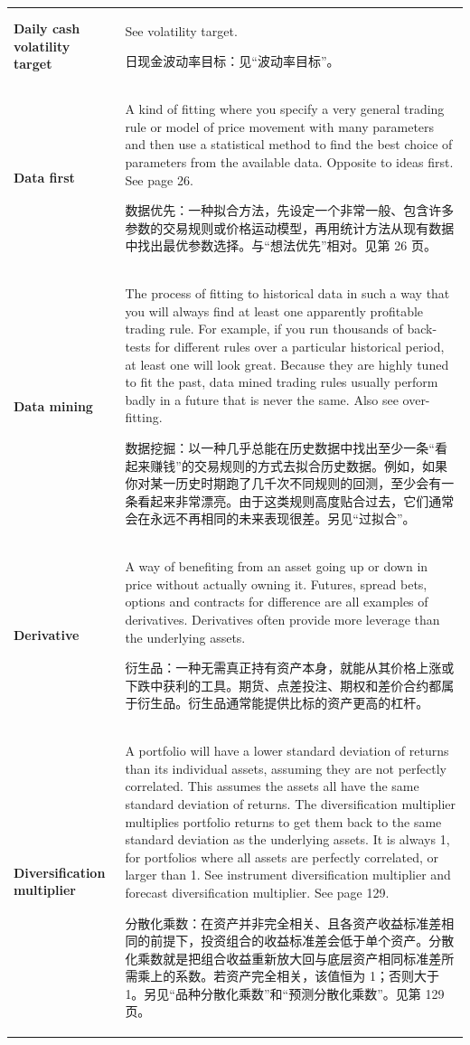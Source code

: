 \begin{chinesetableblock}
{\begin{longtable}{@{}>{\raggedright\arraybackslash\bfseries} p{}>{\raggedright\arraybackslash} p{}@{}}
Daily cash volatility target & See volatility target. \par 日现金波动率目标：见“波动率目标”。 \\[0.65em]
Data first & A kind of fitting where you specify a very general trading rule or model of price movement with many parameters and then use a statistical method to find the best choice of parameters from the available data. Opposite to ideas first. See page 26. \par 数据优先：一种拟合方法，先设定一个非常一般、包含许多参数的交易规则或价格运动模型，再用统计方法从现有数据中找出最优参数选择。与“想法优先”相对。见第 26 页。 \\[0.65em]
Data mining & The process of fitting to historical data in such a way that you will always find at least one apparently profitable trading rule. For example, if you run thousands of back-tests for different rules over a particular historical period, at least one will look great. Because they are highly tuned to fit the past, data mined trading rules usually perform badly in a future that is never the same. Also see over-fitting. \par 数据挖掘：以一种几乎总能在历史数据中找出至少一条“看起来赚钱”的交易规则的方式去拟合历史数据。例如，如果你对某一历史时期跑了几千次不同规则的回测，至少会有一条看起来非常漂亮。由于这类规则高度贴合过去，它们通常会在永远不再相同的未来表现很差。另见“过拟合”。 \\[0.65em]
Derivative & A way of benefiting from an asset going up or down in price without actually owning it. Futures, spread bets, options and contracts for difference are all examples of derivatives. Derivatives often provide more leverage than the underlying assets. \par 衍生品：一种无需真正持有资产本身，就能从其价格上涨或下跌中获利的工具。期货、点差投注、期权和差价合约都属于衍生品。衍生品通常能提供比标的资产更高的杠杆。 \\[0.65em]
Diversification multiplier & A portfolio will have a lower standard deviation of returns than its individual assets, assuming they are not perfectly correlated. This assumes the assets all have the same standard deviation of returns. The diversification multiplier multiplies portfolio returns to get them back to the same standard deviation as the underlying assets. It is always 1, for portfolios where all assets are perfectly correlated, or larger than 1. See instrument diversification multiplier and forecast diversification multiplier. See page 129. \par 分散化乘数：在资产并非完全相关、且各资产收益标准差相同的前提下，投资组合的收益标准差会低于单个资产。分散化乘数就是把组合收益重新放大回与底层资产相同标准差所需乘上的系数。若资产完全相关，该值恒为 1；否则大于 1。另见“品种分散化乘数”和“预测分散化乘数”。见第 129 页。 \\[0.65em]

\end{longtable}}
\end{chinesetableblock}
